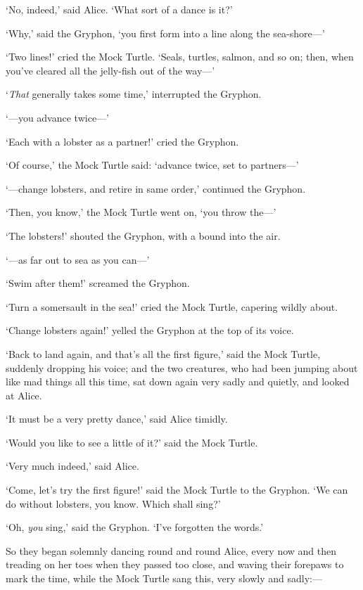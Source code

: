 \documentclass[12pt,openany]{memoir}
\begin{document}
`No, indeed,' said Alice. `What sort of a dance is it?'

`Why,' said the Gryphon, `you first form into a line along the sea-shore---'

`Two lines!' cried the Mock Turtle. `Seals, turtles, salmon, and so on; then, when you've cleared all the jelly-fish out of the way---'

`\textit{That} generally takes some time,' interrupted the Gryphon.

`---you advance twice---'

`Each with a lobster as a partner!' cried the Gryphon.

`Of course,' the Mock Turtle said: `advance twice, set to part\-ners---'

`---change lobsters, and retire in same order,' continued the Gryphon.

`Then, you know,' the Mock Turtle went on, `you throw the---'

`The lobsters!' shouted the Gryphon, with a bound into the air.

`---as far out to sea as you can---'

`Swim after them!' screamed the Gryphon.

`Turn a somersault in the sea!' cried the Mock Turtle, capering wildly about.

`Change lobsters again!' yelled the Gryphon at the top of its voice.

`Back to land again, and that's all the first figure,' said the Mock Turtle, suddenly dropping his voice; and the two creatures, who had been jumping about like mad things all this time, sat down again very sadly and quietly, and looked at Alice.

`It must be a very pretty dance,' said Alice timidly.

`Would you like to see a little of it?' said the Mock Turtle.

`Very much indeed,' said Alice.

`Come, let's try the first figure!' said the Mock Turtle to the Gryphon. `We can do without lobsters, you know. Which shall sing?'

`Oh, \textit{you} sing,' said the Gryphon. `I've forgotten the words.'

So they began solemnly dancing round and round Alice, every now and then treading on her toes when they passed too close, and waving their forepaws to mark the time, while the Mock Turtle sang this, very slowly and sadly:---
\end{document}
